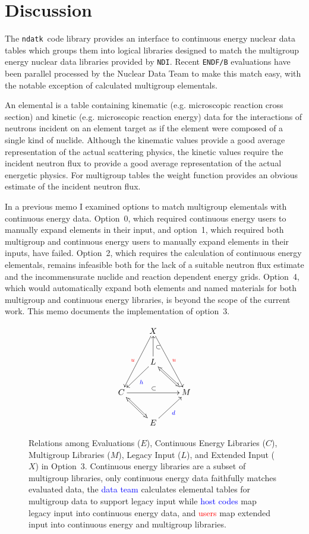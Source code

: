 \documentclass[12pt]{lamemo}
\newcommand{\ndatk}{\texttt{ndatk}}
\newcommand{\NDI}{\texttt{NDI}}
\begin{document}
\newpage

\section{Discussion}

The \ndatk\ code library\cite{gray14} provides an interface to
continuous energy nuclear data tables which groups them into logical
libraries designed to match the multigroup energy nuclear data
libraries provided by \NDI.  Recent \texttt{ENDF/B} evaluations have
been parallel processed by the Nuclear Data Team to make this match
easy, with the notable exception of calculated multigroup elementals.

An elemental is a table containing kinematic (e.g. microscopic
reaction cross section) and kinetic (e.g. microscopic reaction
energy) data for the interactions of neutrons incident on an element
target as if the element were composed of a single kind of nuclide.
Although the kinematic values provide a good average representation of
the actual scattering physics, the kinetic values require the incident
neutron flux to provide a good average representation of the actual
energetic physics.  For multigroup tables the weight function provides
an obvious estimate of the incident neutron flux\cite[Eq.~3]{gray09}.

In a previous memo\cite{gray15} I examined options to match multigroup
elementals with continuous energy data.  Option~0, which required
continuous energy users to manually expand elements in their input,
and option~1, which required both multigroup and continuous energy
users to manually expand elements in their inputs, have failed.
Option~2, which requires the calculation of continuous energy
elementals, remains infeasible both for the lack of a suitable neutron
flux estimate and the incommensurate nuclide and reaction dependent
energy grids.  Option~4, which would automatically expand both
elements and named materials for both multigroup and continuous energy
libraries, is beyond the scope of the current work.  This memo
documents the implementation of option~3.

\begin{figure}\centering
\[
\xymatrix{
  & X \ar[ddl]_{\textcolor{red}{u}} \ar[ddr]^{\textcolor{red}{u}} & \\
  & L \ar[dl]^{\textcolor{blue}{h}} \ar@{<=>}[dr] \ar[u]_{\subset} & \\
  C \ar[rr]^{\subset} & & M \\
  & E \ar@{<=>}[ul] \ar[ur]_{\textcolor{blue}{d}} &
}
\]
\caption{Relations among Evaluations ($E$), Continuous Energy Libraries
  ($C$), Multigroup Libraries ($M$), Legacy Input ($L$), and Extended Input
  ($X$) in Option~3.  Continuous energy libraries are a subset of
  multigroup libraries, only continuous energy data faithfully matches
  evaluated data, the \textcolor{blue}{data team} calculates elemental
  tables for multigroup data to support legacy input while
  \textcolor{blue}{host codes} map legacy input into continuous energy
  data, and \textcolor{red}{users} map extended input into continuous
  energy and multigroup libraries.} \label{fig:3}
\end{figure}
\end{document}

